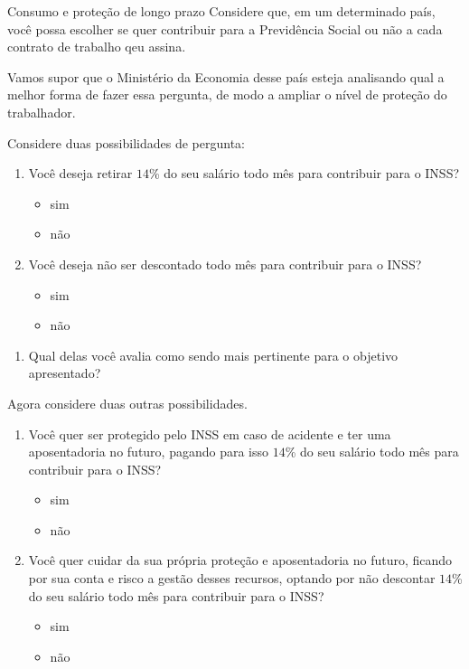 \begin{task}{Consumo e proteção de longo prazo}
Considere que, em um determinado país, você possa escolher se quer contribuir para a Previdência Social ou não a cada contrato de trabalho qeu assina.

Vamos supor que o Ministério da Economia desse país esteja analisando qual a melhor forma de fazer essa pergunta, de modo a ampliar o nível de proteção do trabalhador.

Considere duas possibilidades de pergunta:

\begin{enumerate}[label=\Roman*]
  \item Você deseja retirar $14$\% do seu salário todo mês para contribuir para o INSS?
  \begin{itemize}[label=(\hspace{1em})]
    \item sim
    \item não
  \end{itemize}
  \item Você deseja não ser descontado todo mês para contribuir para o INSS?
  \begin{itemize}[label=(\hspace{1em})]
    \item sim
    \item não
  \end{itemize}
\end{enumerate}

\begin{enumerate}
  \item Qual delas você avalia como sendo mais pertinente para o objetivo apresentado?
\end{enumerate}

Agora considere duas outras possibilidades.
\begin{enumerate}[label=\Roman*]
  \item Você quer ser protegido pelo INSS em caso de acidente e ter uma aposentadoria no futuro, pagando para isso $14$\% do seu salário todo mês para contribuir para o INSS?
  \begin{itemize}[label=(\hspace{1em})]
    \item sim
    \item não
  \end{itemize}
  \needspace{5em}
  \item Você quer cuidar da sua própria proteção e aposentadoria no futuro, ficando por sua conta e risco a gestão desses recursos, optando por não descontar $14$\% do seu salário todo mês para contribuir para o INSS?
  \begin{itemize}[label=(\hspace{1em})]
    \item sim
    \item não
  \end{itemize}
\end{enumerate}


\end{task}
